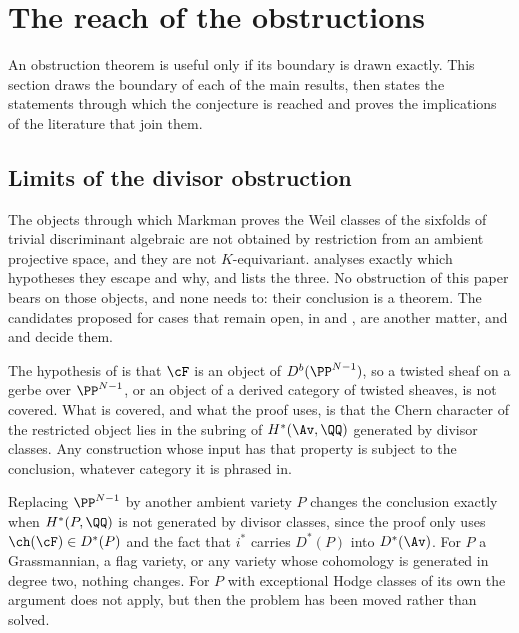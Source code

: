 \section{The reach of the obstructions}\label{sec:scope}

An obstruction theorem is useful only if its boundary is drawn exactly. This
section draws the boundary of each of the main results, then states the
statements through which the conjecture is reached and proves the
implications of the literature that join them.

\subsection{Limits of the divisor obstruction}

\begin{remark}\label{rem:markmanscope}
The objects through which Markman proves the Weil classes of the sixfolds of
trivial discriminant algebraic \cite{Mar25a,Mar25b} are not obtained by
restriction from an ambient projective space, and they are not
$K$-equivariant. \cite[Section~13]{paperI} analyses exactly which hypotheses they
escape and why, and \cite[Proposition~13.5]{paperI} lists the three. No obstruction
of this paper bears on those objects, and none needs to: their conclusion is
a theorem. The candidates proposed for cases that remain open, in
\cite[Section~12]{Mar25b} and \cite[Example~11.2.7]{Mar25c}, are another
matter, and \cite[Theorem~4.61]{paperII} and \cite[Corollary~5.30]{paperII}
decide them.
\end{remark}

\begin{remark}\label{rem:twisted}
The hypothesis of \cite[Theorem~7.3]{paperI} is that $\cF$ is an object of
$D^{b}(\PP^{N-1})$, so a twisted sheaf on a gerbe over $\PP^{N-1}$, or an
object of a derived category of twisted sheaves, is not covered. What is
covered, and what the proof uses, is that the Chern character of the
restricted object lies in the subring of $H^{*}(\Av,\QQ)$ generated by
divisor classes. Any construction whose input has that property is subject to
the conclusion, whatever category it is phrased in.
\end{remark}

\begin{remark}\label{rem:otherambient}
Replacing $\PP^{N-1}$ by another ambient variety $P$ changes the conclusion
exactly when $H^{*}(P,\QQ)$ is not generated by divisor classes, since the
proof only uses $\ch(\cF)\in D^{*}(P)$ and the fact that $i^{*}$ carries
$D^{*}(P)$ into $D^{*}(\Av)$. For $P$ a Grassmannian, a flag variety, or any
variety whose cohomology is generated in degree two, nothing changes. For $P$
with exceptional Hodge classes of its own the argument does not apply, but
then the problem has been moved rather than solved.
\end{remark}

